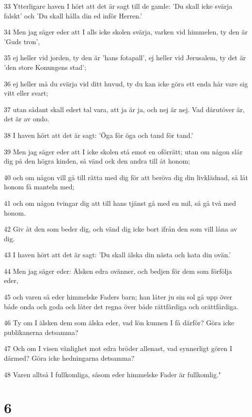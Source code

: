 \par 33 Ytterligare haven I hört att det är sagt till de gamle: 'Du skall icke svärja falskt' och 'Du skall hålla din ed inför Herren.'
\par 34 Men jag säger eder att I alls icke skolen svärja, varken vid himmelen, ty den är 'Guds tron',
\par 35 ej heller vid jorden, ty den är 'hans fotapall', ej heller vid Jerusalem, ty det är 'den store Konungens stad';
\par 36 ej heller må du svärja vid ditt huvud, ty du kan icke göra ett enda hår vare sig vitt eller svart;
\par 37 utan sådant skall edert tal vara, att ja är ja, och nej är nej. Vad därutöver är, det är av ondo.
\par 38 I haven hört att det är sagt: 'Öga för öga och tand för tand.'
\par 39 Men jag säger eder att I icke skolen stå emot en oförrätt; utan om någon slår dig på den högra kinden, så vänd ock den andra till åt honom;
\par 40 och om någon vill gå till rätta med dig för att beröva dig din livklädnad, så låt honom få manteln med;
\par 41 och om någon tvingar dig att till hans tjänst gå med en mil, så gå två med honom.
\par 42 Giv åt den som beder dig, och vänd dig icke bort ifrån den som vill låna av dig.
\par 43 I haven hört att det är sagt: 'Du skall älska din nästa och hata din ovän.'
\par 44 Men jag säger eder: Älsken edra ovänner, och bedjen för dem som förfölja eder,
\par 45 och varen så eder himmelske Faders barn; han låter ju sin sol gå upp över både onda och goda och låter det regna över både rättfärdiga och orättfärdiga.
\par 46 Ty om I älsken dem som älska eder, vad lön kunnen I få därför? Göra icke publikanerna detsamma?
\par 47 Och om I visen vänlighet mot edra bröder allenast, vad synnerligt gören I därmed? Göra icke hedningarna detsamma?
\par 48 Varen alltså I fullkomliga, såsom eder himmelske Fader är fullkomlig."

\chapter{6}

